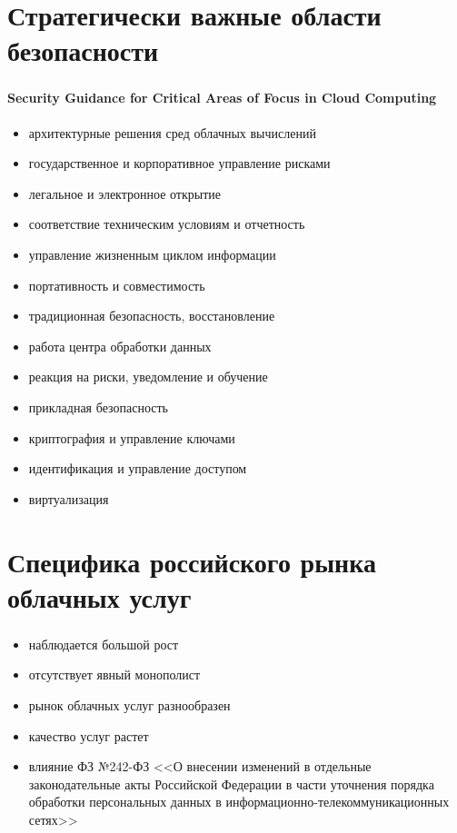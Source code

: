 
\section{Стратегически важные области безопасности}

\begin{frame}
\frametitle{\insertsection}
\framesubtitle{Security Guidance for Critical Areas of Focus in Cloud Computing}

\begin{itemize}
    \item архитектурные решения сред облачных вычислений
    \item государственное и корпоративное управление рисками
    \item легальное и электронное открытие
    \item соответствие техническим условиям и отчетность
    \item управление жизненным циклом информации
    \item портативность и совместимость
    \item традиционная безопасность, восстановление
    \item работа центра обработки данных
    \item реакция на риски, уведомление и обучение
    \item прикладная безопасность
    \item криптография и управление ключами
    \item идентификация и управление доступом
    \item виртуализация
\end{itemize}
\end{frame}


\section{Специфика российского рынка облачных услуг}

\begin{frame}
\frametitle{\insertsection}
\begin{itemize}
    \item наблюдается большой рост
    \item отсутствует явный монополист
    \item рынок облачных услуг разнообразен
    \item качество услуг растет
    \item влияние ФЗ №242-ФЗ <<О внесении изменений в отдельные законодательные акты Российской Федерации в части уточнения порядка обработки персональных данных в информационно-телекоммуникационных сетях>>
\end{itemize}
\end{frame}

